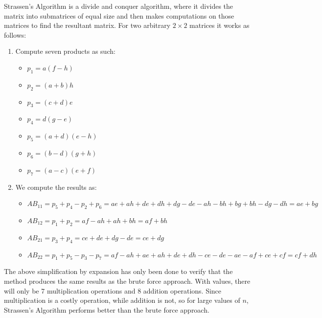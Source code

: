 \documentclass[addpoints]{exam}
\begin{document}
\begin{questions}
\begin{solution}
    Strassen's Algorithm is a divide and conquer algorithm, where it divides the matrix into submatrices of equal size and then makes computations on those matrices to find the resultant matrix. For two arbitrary $ 2 \times 2 $ matrices it works as follows:
    \begin{enumerate}
      \item Compute seven products as such: \begin{itemize}
              \item $ p_1 = a(f - h) $
              \item $ p_2 = (a + b)h $
              \item $ p_3 = (c + d)e $
              \item $ p_4 = d(g - e) $
              \item $ p_5 = (a + d)(e - h) $
              \item $ p_6 = (b - d)(g + h) $
              \item $ p_7 = (a - c)(e + f) $
            \end{itemize}
      \item We compute the results as: \begin{itemize}
              \item $ AB_{11} = p_5 + p_4 - p_2 + p_6 = ae + ah + de + dh + dg - de - ah - bh + bg + bh - dg - dh = ae + bg $
              \item $ AB_{12} = p_1 + p_2 = af - ah + ah + bh = af + bh $
              \item $ AB_{21} = p_3 + p_4 = ce + de + dg - de = ce + dg $
              \item $ AB_{22} = p_1 + p_5 - p_3 - p_7 = af - ah + ae + ah + de + dh - ce - de - ae - af + ce + cf = cf + dh $
            \end{itemize}
    \end{enumerate}
    The above simplification by expansion has only been done to verify that the method produces the same results as the brute force approach. With values, there will only be 7 multiplication operations and 8 addition operations. Since multiplication is a costly operation, while addition is not, so for large values of $n$, Strassen's Algorithm performs better than the brute force approach.


\end{solution}
\end{questions}
\end{document}
